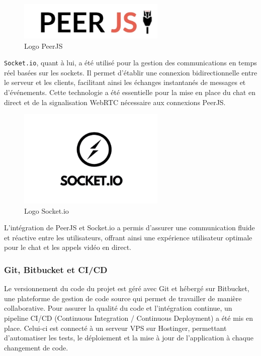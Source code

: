 {\vspace{0.35cm}

\begin{figure}[H]
\begin{center}
\includegraphics[width=7cm]{assets/presentation/peer-js.jpeg}
\end{center}
\caption{Logo PeerJS}
\end{figure}

\verb|Socket.io|, quant à lui, a été utilisé pour la gestion des communications en temps réel basées sur les sockets. Il permet d'établir une connexion bidirectionnelle entre le serveur et les clients, facilitant ainsi les échanges instantanés de messages et d'événements. Cette technologie a été essentielle pour la mise en place du chat en direct et de la signalisation WebRTC nécessaire aux connexions PeerJS.  

\vspace{0.35cm}

\begin{figure}[H]
\begin{center}
\includegraphics[width=7cm]{assets/presentation/socketio.png}
\end{center}
\caption{Logo Socket.io}
\end{figure}

L'intégration de PeerJS et Socket.io a permis d'assurer une communication fluide et réactive entre les utilisateurs, offrant ainsi une expérience utilisateur optimale pour le chat et les appels vidéo en direct.  

\subsubsection*{Git, Bitbucket et CI/CD}
Le versionnement du code du projet est géré avec Git et hébergé sur Bitbucket, une plateforme de gestion de code source qui permet de travailler de manière collaborative. Pour assurer la qualité du code et l'intégration continue, un pipeline CI/CD (Continuous Integration / Continuous Deployment) a été mis en place. Celui-ci est connecté à un serveur VPS sur Hostinger, permettant d’automatiser les tests, le déploiement et la mise à jour de l’application à chaque changement de code.

}
